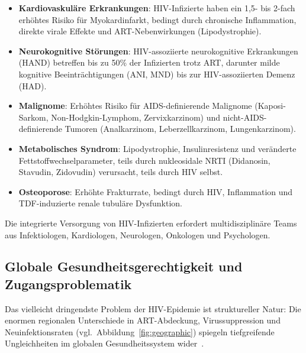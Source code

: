 ﻿\documentclass[a4paper,12pt]{article}
\theoremstyle{definition}
\begin{document}
\begin{itemize}
\item \textbf{Kardiovaskul\"are Erkrankungen}: HIV-Infizierte haben ein 1{,}5- bis
      2-fach erh\"ohtes Risiko f\"ur Myokardinfarkt, bedingt durch chronische
      Inflammation, direkte virale Effekte und ART-Nebenwirkungen (Lipodystrophie).

\item \textbf{Neurokognitive St\"orungen}: HIV-assoziierte neurokognitive Erkrankungen
      (HAND) betreffen bis zu 50\% der Infizierten trotz ART, darunter milde
      kognitive Beeintr\"achtigungen (ANI, MND) bis zur HIV-assoziierten Demenz (HAD).

\item \textbf{Malignome}: Erh\"ohtes Risiko f\"ur AIDS-definierende Malignome
      (Kaposi-Sarkom, Non-Hodgkin-Lymphom, Zervixkarzinom) und nicht-AIDS-definierende
      Tumoren (Analkarzinom, Leberzellkarzinom, Lungenkarzinom).

\item \textbf{Metabolisches Syndrom}: Lipodystrophie, Insulinresistenz und
      ver\"anderte Fettstoffwechselparameter, teils durch nukleosidale NRTI
      (Didanosin, Stavudin, Zidovudin) verursacht, teils durch HIV selbst.

\item \textbf{Osteoporose}: Erh\"ohte Frakturrate, bedingt durch HIV,
      Inflammation und TDF-induzierte renale tubuläre Dysfunktion.
\end{itemize}

Die integrierte Versorgung von HIV-Infizierten erfordert multidisziplinäre Teams
aus Infektiologen, Kardiologen, Neurologen, Onkologen und Psychologen.

\subsection{Globale Gesundheitsgerechtigkeit und Zugangsproblematik}

Das vielleicht dringendste Problem der HIV-Epidemie ist struktureller Natur:
Die enormen regionalen Unterschiede in ART-Abdeckung, Virussuppression und
Neuinfektionsraten (vgl.\ Abbildung~\ref{fig:geographic}) spiegeln tiefgreifende
Ungleichheiten im globalen Gesundheitssystem wider~\cite{bekker2023hiv}.
\end{document}
